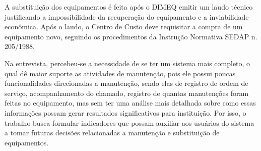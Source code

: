 A substituição dos equipamentos é feita após o DIMEQ emitir um laudo técnico justificando a impossibilidade da recuperação do equipamento e a inviabilidade econômica. Após o laudo, o Centro de Custo deve requisitar a compra de um equipamento novo, seguindo os procedimentos da Instrução Normativa SEDAP n. 205/1988.

Na entrevista, percebeu-se a necessidade de se ter um sistema mais completo, o qual dê maior suporte as atividades de manutenção, pois ele possui poucas funcionalidades direcionadas a manutenção, sendo elas de registro de ordem de serviço, acompanhamento do chamado, registro de quantas manutenções foram feitas no equipamento, mas sem ter uma análise mais detalhada sobre como essas informações possam gerar resultados significativos para instituição. Por isso, o trabalho busca formular indicadores que possam auxiliar aos usuários do sistema a tomar futuras decisões relacionadas a manutenção e substituição de equipamentos. 






